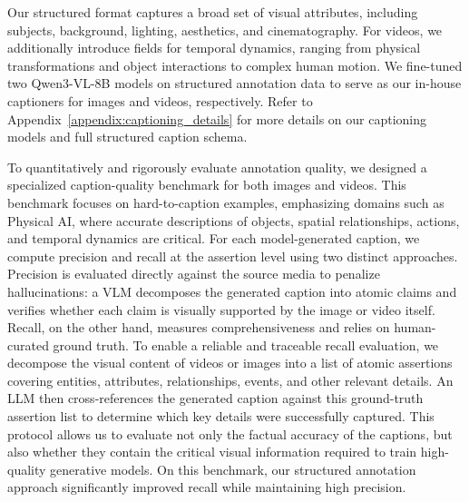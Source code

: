 Our structured format captures a broad set of visual attributes, including subjects, background, lighting, aesthetics, and cinematography. For videos, we additionally introduce fields for temporal dynamics, ranging from physical transformations and object interactions to complex human motion. We fine-tuned two \mbox{Qwen3-VL-8B} models on structured annotation data to serve as our in-house captioners for images and videos, respectively. Refer to Appendix~\ref{appendix:captioning_details} for more details on our captioning models and full structured caption schema.

To quantitatively and rigorously evaluate annotation quality, we designed a specialized caption-quality benchmark for both images and videos. This benchmark focuses on hard-to-caption examples, emphasizing domains such as Physical AI, where accurate descriptions of objects, spatial relationships, actions, and temporal dynamics are critical. For each model-generated caption, we compute precision and recall at the assertion level using two distinct approaches. Precision is evaluated directly against the source media to penalize hallucinations: a VLM decomposes the generated caption into atomic claims and verifies whether each claim is visually supported by the image or video itself. Recall, on the other hand, measures comprehensiveness and relies on human-curated ground truth. To enable a reliable and traceable recall evaluation, we decompose the visual content of videos or images into a list of atomic assertions covering entities, attributes, relationships, events, and other relevant details. An LLM then cross-references the generated caption against this ground-truth assertion list to determine which key details were successfully captured. This protocol allows us to evaluate not only the factual accuracy of the captions, but also whether they contain the critical visual information required to train high-quality generative models. On this benchmark, our structured annotation approach significantly improved recall while maintaining high precision.
